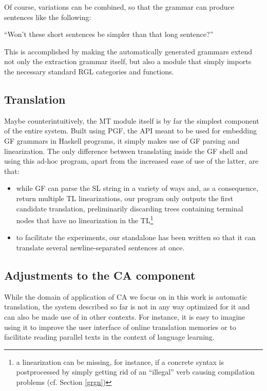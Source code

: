 Of course, variations can be combined, so that the grammar can produce sentences like the following:

\begin{example}
    ``Won't these short sentences be simpler than that long sentence?''
\end{example}

This is accomplished by making the automatically generated grammars extend not only the extraction grammar itself, but also a module that simply imports the necessary standard RGL categories and functions.

\subsection{Translation} \label{mt}
Maybe counterintuitively, the MT module itself is by far the simplest component of the entire system. 
Built using PGF, the API meant to be used for embedding GF grammars in Haskell programs, it simply makes use of GF parsing and linearization.
The only difference between translating inside the GF shell and using this ad-hoc program, apart from the increased ease of use of the latter, are that: \smallskip

\begin{itemize}
    \item while GF can parse the SL string in a variety of ways and, as a consequence, return multiple TL linearizations, our program only outputs the first candidate translation, preliminarily discarding trees containing terminal nodes that have no linearization in the TL\footnote{a linearization can be missing, for instance, if a concrete syntax is postprocessed by simply getting rid of an ``illegal'' verb causing compilation problems (cf. Section \ref{grgn})} 
    \item to facilitate the experiments, our standalone has been written so that it can translate several newline-separated sentences at once.
\end{itemize}

\subsection{Adjustments to the CA component} \label{tuning}

While the domain of application of CA we focus on in this work is automatic translation, the system described so far is not in any way optimized for it and can also be made use of in other contexts. 
For instance, it is easy to imagine using it to improve the user interface of online translation memories or to facilitate reading parallel texts in the context of language learning. \smallskip

